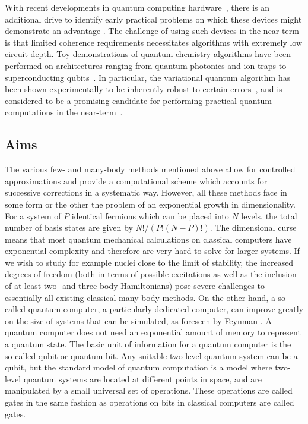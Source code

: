 \documentclass[10pt]{article}
\begin{document}
With recent developments in quantum computing
hardware~\cite{Corcoles2015,Riste2015,Kelly2015,Barends2016,Roushan2017},
there is an additional drive to identify early practical problems on
which these devices might demonstrate an advantage
\cite{Mohseni2017,Boixo2016}. The challenge of using such devices in
the near-term is that limited coherence requirements necessitates
algorithms with extremely low circuit depth. Toy demonstrations of
quantum chemistry algorithms have been performed on architectures
ranging from quantum photonics and ion traps to superconducting
qubits~\cite{Lanyon2010,Li2011,Wang2014,Peruzzo2013,Shen2015,OMalley2016,Kandala2017}. In
particular, the variational quantum algorithm
\cite{Peruzzo2013,McClean2015} has been shown experimentally to be
inherently robust to certain errors~\cite{OMalley2016}, and is
considered to be a promising candidate for performing practical
quantum computations in the near-term~\cite{Wecker2015a,Mueck2015}.

\subsection{Aims}

The various few- and many-body methods mentioned above allow for
controlled approximations and provide a computational scheme which
accounts for successive corrections in a systematic way.
However, all these methods face in some form or the other the problem
of an exponential growth in dimensionality. For a system of $P$
identical fermions which can be placed into $N$ levels, the total number of
basis states are given by $N!/(P!(N-P)!)$.
The dimensional curse means that most quantum mechanical calculations
on classical computers have exponential complexity and therefore are
very hard to solve for larger systems.  If we wish to study for
example nuclei close to the limit of stability, the increased degrees
of freedom (both in terms of possible excitations as well as the
inclusion of at least two- and three-body Hamiltonians) pose severe
challenges to essentially all existing classical many-body methods.
On the other hand, a so-called quantum computer, a particularly
dedicated computer, can improve greatly on the size of systems that
can be simulated, as foreseen by Feynman
\cite{feynman1982,feynman1986}. A quantum computer does not need an
exponential amount of memory to represent a quantum state.  The basic
unit of information for a quantum computer is the so-called qubit or
quantum bit. Any suitable two-level quantum system can be a qubit, but
the standard model of quantum computation is a model where two-level
quantum systems are located at different points in space, and are
manipulated by a small universal set of operations.  These operations
are called gates in the same fashion as operations on bits in
classical computers are called gates.
\end{document}
